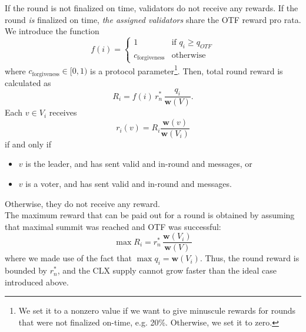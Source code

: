 If the round is not finalized on time, validators do not receive any rewards. If the round \emph{is} finalized on time, \emph{the assigned validators} share the OTF reward pro rata.
%
%
We introduce the function
%
\begin{equation}
  f(i) =
  \begin{cases}
    1 & \text{if } q_{i} \geq q_{OTF} \\
    c_\text{forgiveness} & \text{otherwise}
  \end{cases}
\end{equation}
%
where $c_\text{forgiveness} \in [0,1)$ is a protocol parameter\footnote{We set it to a nonzero value if we want to give minuscule rewards for rounds that were not finalized on-time, e.g. 20\%. Otherwise, we set it to zero.}. Then, total round reward is calculated as
%
\begin{equation}
  R_i = f(i) \, r^\ast_n \,
  \frac{q_{i}}{\boldsymbol{w}(V)}
  .
\end{equation}
%
Each $v\in V_i$ receives
%
\begin{equation}
  r_i(v) = R_i \frac{\boldsymbol{w}(v)}{\boldsymbol{w}(V_i)}
\end{equation}
%
if and only if
%
\begin{itemize}
\item $v$ is the leader, and has sent valid and in-round \PROP and \WIT messages, or
\item $v$ is a voter, and has sent valid and in-round \PROP and \CONF messages.
\end{itemize}
%
Otherwise, they do not receive any reward.
%
\\The maximum reward that can be paid out for a round is obtained by assuming that maximal summit was reached and OTF was successful:
%
\begin{equation}
  \max R_i = r^\ast_n \,
  \frac{\boldsymbol{w}(V_i)}{\boldsymbol{w}(V)}
\end{equation}
%
where we made use of the fact that $\max q_{i} = \boldsymbol{w}(V_i)$. Thus, the round reward is bounded by $r^\ast_n$, and the CLX supply cannot grow faster than the ideal case introduced above.

